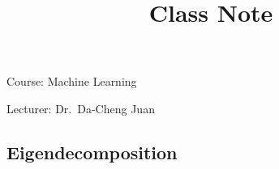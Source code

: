 \documentclass{article}
\begin{document}
\title{Class Note}
\Large{Course: Machine Learning}

\Large{Lecturer: Dr.\ Da-Cheng Juan}
%
%
\setcounter{section}{2}
\setcounter{subsection}{6}
\renewcommand\thefigure{\thesection.\arabic{figure}}
\subsection{Eigendecomposition}
\label{Ch2.7}

%
%
%
\end{document}
